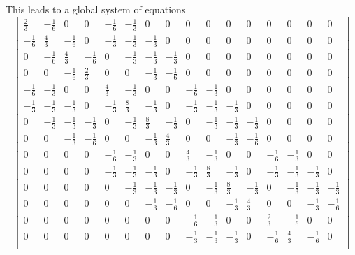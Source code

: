 This leads to a global system of equations
\begin{equation}
  \begin{bmatrix}
  \frac{2}{3} & -\frac{1}{6} & 0 & 0 & -\frac{1}{6} & -\frac{1}{3} & 0 & 0 & 0 & 0 & 0 & 0 & 0 & 0 & 0 & 0 \\
  -\frac{1}{6} & \frac{4}{3} & -\frac{1}{6} & 0 & -\frac{1}{3} & -\frac{1}{3} & -\frac{1}{3} & 0 & 0 & 0 & 0 & 0 & 0 & 0 & 0 & 0 \\
  0 & -\frac{1}{6} & \frac{4}{3} & -\frac{1}{6} & 0 & -\frac{1}{3} & -\frac{1}{3} & -\frac{1}{3} & 0 & 0 & 0 & 0 & 0 & 0 & 0 & 0 \\
  0 & 0 & -\frac{1}{6} & \frac{2}{3} & 0 & 0 & -\frac{1}{3} & -\frac{1}{6} & 0 & 0 & 0 & 0 & 0 & 0 & 0 & 0 \\
  -\frac{1}{6} & -\frac{1}{3} & 0 & 0 & \frac{4}{3} & -\frac{1}{3} & 0 & 0 & -\frac{1}{6} & -\frac{1}{3} & 0 & 0 & 0 & 0 & 0 & 0 \\
  -\frac{1}{3} & -\frac{1}{3} & -\frac{1}{3} & 0 & -\frac{1}{3} & \frac{8}{3} & -\frac{1}{3} & 0 & -\frac{1}{3} & -\frac{1}{3} & -\frac{1}{3} & 0 & 0 & 0 & 0 & 0 \\
  0 & -\frac{1}{3} & -\frac{1}{3} & -\frac{1}{3} & 0 & -\frac{1}{3} & \frac{8}{3} & -\frac{1}{3} & 0 & -\frac{1}{3} & -\frac{1}{3} & -\frac{1}{3} & 0 & 0 & 0 & 0 \\
  0 & 0 & -\frac{1}{3} & -\frac{1}{6} & 0 & 0 & -\frac{1}{3} & \frac{4}{3} & 0 & 0 & -\frac{1}{3} & -\frac{1}{6} & 0 & 0 & 0 & 0 \\
  0 & 0 & 0 & 0 & -\frac{1}{6} & -\frac{1}{3} & 0 & 0 & \frac{4}{3} & -\frac{1}{3} & 0 & 0 & -\frac{1}{6} & -\frac{1}{3} & 0 & 0 \\
  0 & 0 & 0 & 0 & -\frac{1}{3} & -\frac{1}{3} & -\frac{1}{3} & 0 & -\frac{1}{3} & \frac{8}{3} & -\frac{1}{3} & 0 & -\frac{1}{3} & -\frac{1}{3} & -\frac{1}{3} & 0 \\
  0 & 0 & 0 & 0 & 0 & -\frac{1}{3} & -\frac{1}{3} & -\frac{1}{3} & 0 & -\frac{1}{3} & \frac{8}{3} & -\frac{1}{3} & 0 & -\frac{1}{3} & -\frac{1}{3} & -\frac{1}{3} \\
  0 & 0 & 0 & 0 & 0 & 0 & -\frac{1}{3} & -\frac{1}{6} & 0 & 0 & -\frac{1}{3} & \frac{4}{3} & 0 & 0 & -\frac{1}{3} & -\frac{1}{6} \\
  0 & 0 & 0 & 0 & 0 & 0 & 0 & 0 & -\frac{1}{6} & -\frac{1}{3} & 0 & 0 & \frac{2}{3} & -\frac{1}{6} & 0 & 0 \\
  0 & 0 & 0 & 0 & 0 & 0 & 0 & 0 & -\frac{1}{3} & -\frac{1}{3} & -\frac{1}{3} & 0 & -\frac{1}{6} & \frac{4}{3} & -\frac{1}{6} & 0 \\

\end{bmatrix}
\end{equation}
